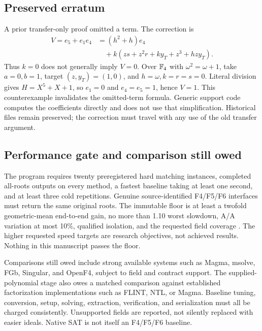 \subsection{Preserved erratum}
A prior transfer-only proof omitted a term. The correction  is
\[
 \begin{split}
 V=e_5+e_1e_4
   &=(h^2+h)e_4\\
   &\quad+k(zs+z^2r+ky_T+z^3+hz y_T).
 \end{split}
\]
Thus $k=0$ does not generally imply $V=0$.
Over $\mathbb F_4$ with $\omega^2=\omega+1$, take $a=0,b=1$, target
$(z,y_T)=(1,0)$, and $h=\omega,k=r=s=0$. Literal division gives
$H=X^5+X+1$, so $e_1=0$ and $e_4=e_5=1$, hence $V=1$.
This counterexample invalidates the omitted-term formula.
Generic support code computes the coefficients directly and does not use
that simplification. Historical files remain preserved; the correction
must travel with any use of the old transfer argument.

\subsection{Performance gate and comparison still owed}
The program requires twenty preregistered hard matching instances, completed
all-roots outputs on every method, a fastest baseline taking at least one
second, and at least three cold repetitions. Genuine source-identified
F4/F5/F6 interfaces must return the same original roots. The immutable floor
is at least a twofold geometric-mean end-to-end gain, no more than 1.10 worst
slowdown, A/A variation at most 10\%, qualified isolation, and the requested
field coverage . The higher requested speed targets are research
objectives, not achieved results. Nothing in this manuscript passes the floor.

Comparisons still owed include strong available systems such as Magma,
msolve, FGb, Singular, and OpenF4, subject to field and contract support.
The supplied-polynomial stage also owes a matched comparison against
established factorization implementations such as FLINT, NTL, or Magma.
Baseline tuning, conversion, setup, solving, extraction, verification, and
serialization must all be charged consistently. Unsupported fields are
reported, not silently replaced with easier ideals. Native SAT is not
itself an F4/F5/F6 baseline.

